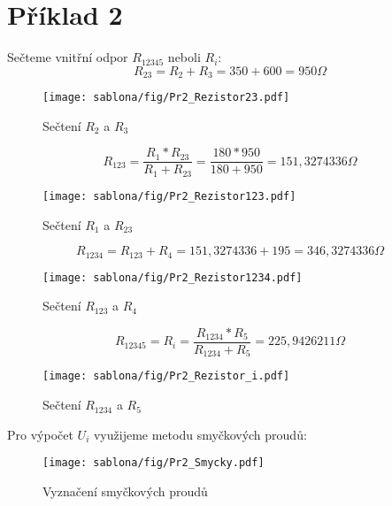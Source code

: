 \section{Příklad 2}

Sečteme vnitřní odpor $R_{12345}$ neboli $R_i$:
$$R_{23} = R_2 + R_3 = 350 + 600 = 950\Omega$$
    \begin{figure}[htb]
    \centering
    \texttt{[image: sablona/fig/Pr2\_Rezistor23.pdf]} \\
    \caption{Sečtení $R_2$ a $R_3$}
    \end{figure}
\newpage

$$R_{123} = \frac{R_1*R_{23}}{R_1+R_{23}} = \frac{180*950}{180+950} = 151,3274336\Omega$$
\begin{figure}[htb]
    \centering
    \texttt{[image: sablona/fig/Pr2\_Rezistor123.pdf]} \\
    \caption{Sečtení $R_1$ a $R_{23}$}
    \end{figure}
    
$$R_{1234} =  R_{123} + R_4 = 151,3274336 + 195 = 346,3274336\Omega$$
\begin{figure}[htb]
    \centering
    \texttt{[image: sablona/fig/Pr2\_Rezistor1234.pdf]} \\
    \caption{Sečtení $R_{123}$ a $R_{4}$}
    \end{figure}
    
$$R_{12345} = R_i = \frac{R_{1234}*R_5}{R_{1234}+R_5}= 225,9426211\Omega$$
\begin{figure}[htb]
    \centering
    \texttt{[image: sablona/fig/Pr2\_Rezistor\_i.pdf]} \\
    \caption{Sečtení $R_{1234}$ a $R_{5}$}
    \end{figure}
\newpage
Pro výpočet $U_i$ využijeme metodu smyčkových proudů:
\begin{figure}[htb]
    \centering
    \texttt{[image: sablona/fig/Pr2\_Smycky.pdf]} \\
    \caption{Vyznačení smyčkových proudů}
    \end{figure}

